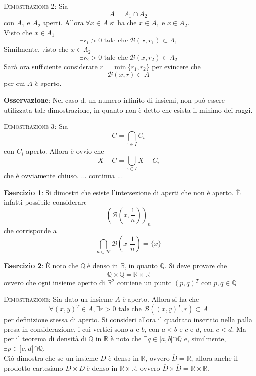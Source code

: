 \documentclass[a4paper]{extarticle}
\begin{document}
\vspace{2em}
\noindent
\normalfont \normalsize
\textsc{Dimostrazione 2}: Sia
\[A=A_1 \cap A_2\]
con $A_1$ e $A_2$ aperti. Allora $\forall x \in A$ si ha che $x \in A_1$ e $x \in A_2$.\\
Visto che $x \in A_1$
\[\exists r_1 > 0 \text{ tale che } \mathcal{B}(x,r_1) \subset A_1\]
Similmente, visto che $x \in A_2$
\[\exists r_2 > 0 \text{ tale che } \mathcal{B}(x,r_2) \subset A_2\]
Sarà ora sufficiente considerare $r=\min\{r_1,r_2\}$ per evincere che
\[\mathcal{B}(x,r) \subset A\]
per cui $A$ è aperto.

\vspace{1em}
\noindent
\textbf{Osservazione}: Nel caso di un numero infinito di insiemi, non può essere utilizzata tale dimostrazione, in quanto non è detto che esista il minimo dei raggi.

\vspace{2em}
\noindent
\normalfont \normalsize
\textsc{Dimostrazione 3}: Sia
\[C = \bigcap_{i \in I} C_i\]
con $C_i$ aperto. Allora è ovvio che
\[X-C=\bigcup_{i \in I} X - C_i\]
che è ovviamente chiuso.
... continua ...

\vspace{2em}
\noindent
\textbf{Esercizio 1}: Si dimostri che esiste l'intersezione di aperti che non è aperto. È infatti possibile considerare
\[\left(\mathcal{B} \left(x,\frac{1}{n}\right)\right)_n\]
che corrisponde a
\[\bigcap_{n \in \mathcal{N}} \mathcal{B} \left(x,\frac{1}{n}\right) = \{x\}\]

\vspace{2em}
\noindent
\textbf{Esercizio 2}: È noto che $\mathbb{Q}$ è denso in $\mathbb{R}$, in quanto $\overline{\mathbb{Q}}$. Si deve provare che
\[\overline{\mathbb{Q} \times \mathbb{Q}} = \mathbb{R} \times \mathbb{R}\]
ovvero che ogni insieme aperto di $\mathbb{R}^2$ contiene un punto $\left(p,q\right){^T}$ con $p,q \in \mathbb{Q}$

\vspace{2em}
\noindent
\normalfont \normalsize
\textsc{Dimostrazione}: Sia dato un insieme $A$ è aperto. Allora si ha che
\[\forall (x,y){^T} \in A, \exists r > 0 \text{ tale che } \mathcal{B}((x,y){^T}, r) \subset A\]
per definizione stessa di aperto. Si consideri allora il quadrato inscritto nella palla presa in considerazione, i cui vertici sono $a$ e $b$, con $a < b$ e $c$ e $d$, con $c < d$. Ma per il teorema di densità di $\mathbb{Q}$ in $\mathbb{R}$ è noto che $\exists q \in ]a,b[ \cap \mathbb{Q}$ e, similmente, $\exists p \in ]c,d[ \cap \mathbb{Q}$.\\
Ciò dimostra che se un insieme $D$ è denso in $\mathbb{R}$, ovvero $\overline{D} = \mathbb{R}$, allora anche il prodotto cartesiano $D \times D$ è denso in $\mathbb{R} \times \mathbb{R}$, ovvero $\overline{D} \times \overline{D} = \mathbb{R} \times \mathbb{R}$.
\end{document}
